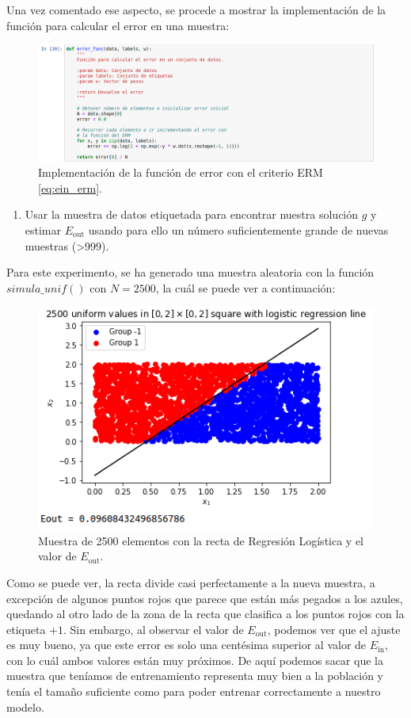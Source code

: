 \documentclass[11pt,a4paper]{article}
\newcommand{\eout}{$E_{\text{out}}$}
\newcommand{\ein}{$E_{\text{in}}$}
\begin{document}
Una vez comentado ese aspecto, se procede a mostrar la implementación de la función para calcular
el error en una muestra:

\begin{figure}[H]
\centering
\includegraphics[scale=0.4]{img/error_func.png}
\caption{Implementación de la función de error con el criterio ERM \eqref{eq:ein_erm}.}
\end{figure}

\begin{enumerate}[resume,label=\textit{\alph*})]
	\item Usar la muestra de datos etiquetada para encontrar nuestra solución $g$ y estimar 
	\eout{} usando para ello un número suficientemente grande de nuevas muestras (>999).
\end{enumerate}

Para este experimento, se ha generado una muestra aleatoria con la función $simula\_unif()$ con
$N = 2500$, la cuál se puede ver a continuación:

\begin{figure}[H]
\centering
\includegraphics[scale=0.6]{img/regression_3.png}
\caption{Muestra de 2500 elementos con la recta de Regresión Logística y el valor de \eout{}.}
\end{figure}

Como se puede ver, la recta divide casi perfectamente a la nueva muestra, a excepción de algunos
puntos rojos que parece que están más pegados a los azules, quedando al otro lado de la zona de
la recta que clasifica a los puntos rojos con la etiqueta $+1$.
Sin embargo, al observar el valor de \eout{}, podemos ver que el ajuste es muy bueno, ya que este
error es solo una centésima superior al valor de \ein{}, con lo cuál ambos valores están muy próximos.
De aquí podemos sacar que la muestra que teníamos de entrenamiento representa muy bien a la población
y tenía el tamaño suficiente como para poder entrenar correctamente a nuestro modelo.
\end{document}
